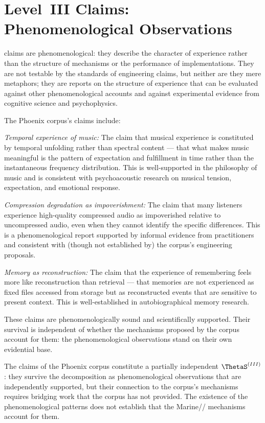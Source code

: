 \section{Level~III Claims: Phenomenological Observations}
\label{sec:level3-claims}

\LevelIII{} claims are phenomenological: they describe
the character of experience rather than the structure
of mechanisms or the performance of implementations.
They are not testable by the standards of engineering
claims, but neither are they mere metaphors; they are
reports on the structure of experience that can be
evaluated against other phenomenological accounts and
against experimental evidence from cognitive science
and psychophysics.

The Phoenix corpus's \LevelIII{} claims include:

\textit{Temporal experience of music:} The claim that
musical experience is constituted by temporal unfolding
rather than spectral content --- that what makes music
meaningful is the pattern of expectation and fulfillment
in time rather than the instantaneous frequency
distribution. This is well-supported in the philosophy
of music and is consistent with psychoacoustic research
on musical tension, expectation, and emotional response.

\textit{Compression degradation as impoverishment:}
The claim that many listeners experience high-quality
compressed audio as impoverished relative to uncompressed
audio, even when they cannot identify the specific
differences. This is a phenomenological report supported
by informal evidence from practitioners and consistent
with (though not established by) the corpus's engineering
proposals.

\textit{Memory as reconstruction:} The claim that
the experience of remembering feels more like reconstruction
than retrieval --- that memories are not experienced
as fixed files accessed from storage but as reconstructed
events that are sensitive to present context. This is
well-established in autobiographical memory research.

These claims are phenomenologically sound and scientifically
supported. Their survival is independent of whether
the mechanisms proposed by the corpus account for them:
the phenomenological observations stand on their own
evidential base.

\begin{auditprop}
\label{ap:level3-phenomenological}
The \LevelIII{} claims of the Phoenix corpus constitute
a partially independent $\ThetaS^{(III)}$: they survive
the decomposition as phenomenological observations that
are independently supported, but their connection to
the corpus's mechanisms requires bridging work that
the corpus has not provided. The existence of the
phenomenological patterns does not establish that the
Marine/\MEMeight{}/\HCFone{} mechanisms account for them.
\end{auditprop}

